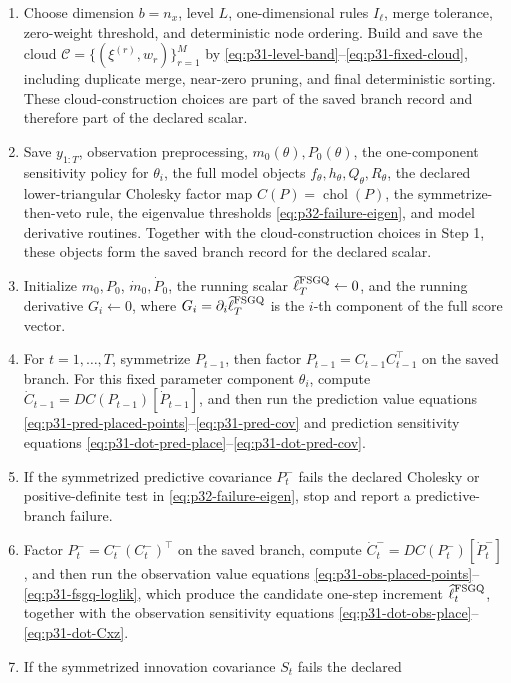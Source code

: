 \documentclass[11pt]{article}
\numberwithin{equation}{section}
\newcommand{\chol}{\operatorname{chol}}
\newcommand{\ellhat}{\widehat\ell}
\begin{document}
{\begin{minipage}{0.94\linewidth}
\begin{enumerate}[leftmargin=0.22in]
\item Choose dimension \(b=n_x\), level \(L\), one-dimensional rules
\(I_\ell\), merge tolerance, zero-weight threshold, and deterministic node
ordering.  Build and save the cloud \(\mathcal C=\{(\xi^{(r)},w_r)\}_{r=1}^M\)
by \eqref{eq:p31-level-band}--\eqref{eq:p31-fixed-cloud}, including duplicate
merge, near-zero pruning, and final deterministic sorting.  These cloud-construction
choices are part of the saved branch record and therefore part of the declared
scalar.
\item Save \(y_{1:T}\), observation preprocessing, \(m_0(\theta),P_0(\theta)\),
the one-component sensitivity policy for \(\theta_i\), the full model objects
\(f_\theta,h_\theta,Q_\theta,R_\theta\), the declared lower-triangular Cholesky
factor map \(C(P)=\chol(P)\), the symmetrize-then-veto rule, the eigenvalue thresholds
\eqref{eq:p32-failure-eigen}, and model derivative routines.  Together with the
cloud-construction choices in Step 1, these objects form the saved branch
record for the declared scalar.
\item Initialize \(m_0,P_0\), \(\dot m_0,\dot P_0\), the running scalar
\(\ellhat_T^{\rm FSGQ}\gets 0\), and the running derivative
\(G_i\gets 0\), where \(G_i=\partial_i\ellhat_T^{\rm FSGQ}\) is the
\(i\)-th component of the full score vector.
\item For \(t=1,\ldots,T\), symmetrize \(P_{t-1}\), then factor
\(P_{t-1}=C_{t-1}C_{t-1}^\top\) on the saved branch.  For this fixed
parameter component \(\theta_i\), compute
\(\dot C_{t-1}=DC(P_{t-1})[\dot P_{t-1}]\), and then run the prediction value
 equations \eqref{eq:p31-pred-placed-points}--\eqref{eq:p31-pred-cov} and
prediction sensitivity equations \eqref{eq:p31-dot-pred-place}--\eqref{eq:p31-dot-pred-cov}.
\item If the symmetrized predictive covariance \(P_t^-\) fails the declared
Cholesky or positive-definite test in \eqref{eq:p32-failure-eigen}, stop and
report a predictive-branch failure.
\item Factor \(P_t^-=C_t^-(C_t^-)^\top\) on the saved branch, compute
\(\dot C_t^-=DC(P_t^-)[\dot P_t^-]\), and then run the observation value
equations \eqref{eq:p31-obs-placed-points}--\eqref{eq:p31-fsgq-loglik}, which
produce the candidate one-step increment \(\ellhat_t^{\rm FSGQ}\), together with the
observation sensitivity equations \eqref{eq:p31-dot-obs-place}--\eqref{eq:p31-dot-Cxz}.
\item If the symmetrized innovation covariance \(S_t\) fails the declared

\end{enumerate}
\end{minipage}}
\end{document}
